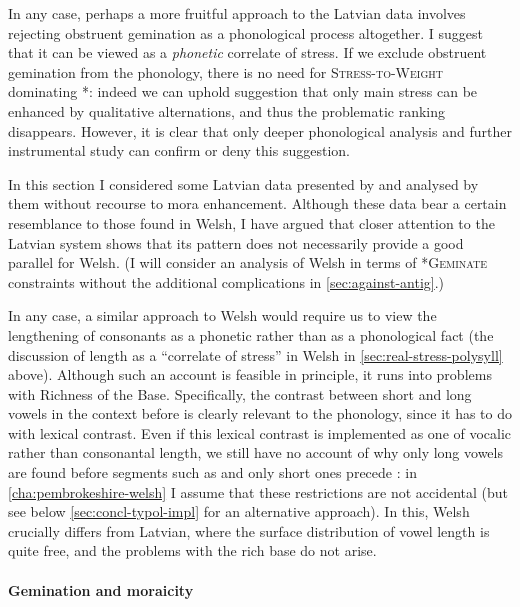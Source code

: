 In any case, perhaps a more fruitful approach to the Latvian data involves rejecting obstruent gemination as a phonological process altogether. I suggest that it can be viewed as a \emph{phonetic} correlate of stress. If we exclude obstruent gemination from the phonology, there is no need for \textsc{Stress\hyp to\hyp Weight} dominating *\mo[voiceless]: indeed we can uphold  suggestion that only main stress can be enhanced by qualitative alternations, and thus the problematic ranking disappears. However, it is clear that only deeper phonological analysis and further instrumental study can confirm or deny this suggestion.

In this section I considered some Latvian data presented by \citet{bye08} and analysed by them without recourse to mora enhancement. Although these data bear a certain resemblance to those found in Welsh, I have argued that closer attention to the Latvian system shows that its pattern does not necessarily provide a good parallel for Welsh. (I will consider an analysis of Welsh in terms of *\textsc{Geminate} constraints without the additional complications in \cref{sec:against-antig}.)

In any case, a similar approach to Welsh would require us to view the lengthening of consonants as a phonetic rather than as a phonological fact (\cf the discussion of length as a \enquote{correlate of stress} in Welsh in \cref{sec:real-stress-polysyll} above). Although such an account is feasible in principle, it runs into problems with Richness of the Base. Specifically, the contrast between short and long vowels in the context before \ipa{[n~l~r]} is clearly relevant to the phonology, since it has to do with lexical contrast. Even if this lexical contrast is implemented as one of vocalic rather than consonantal length, we still have no account of why only long vowels are found before segments such as \ipa{[b~d~ɡ]} and only short ones precede \ipa{[p~t~k]}: in \cref{cha:pembrokeshire-welsh} I assume that these restrictions are not accidental (but see below \cref{sec:concl-typol-impl} for an alternative approach). In this, Welsh crucially differs from Latvian, where the surface distribution of vowel length is quite free, and the problems with the rich base do not arise.

\paragraph{Gemination and moraicity}
\label{sec:gemination-moraicity}

